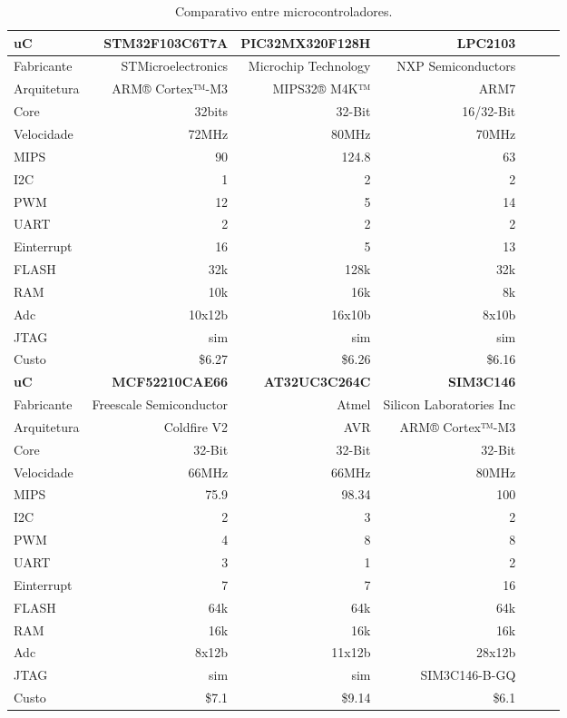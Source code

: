 \begin{table}[h]
\caption{Comparativo entre microcontroladores.}
\centering
\begin{tabular}{l|rrrrrr}
\toprule
\textbf{uC} & \textbf{STM32F103C6T7A} & \textbf{PIC32MX320F128H} & \textbf{LPC2103} \\ \hline
Fabricante & STMicroelectronics & Microchip Technology & NXP Semiconductors \\ \hline
Arquitetura & ARM® Cortex™-M3 & MIPS32® M4K™ & ARM7 \\ \hline
Core & 32bits & 32-Bit & 16/32-Bit \\ \hline
Velocidade & 72MHz & 80MHz & 70MHz \\ \hline
MIPS & 90 & 124.8 & 63 \\ \hline
I2C & 1 & 2 & 2 \\ \hline
PWM & 12 & 5 & 14 \\ \hline
UART & 2 & 2 & 2 \\ \hline
Einterrupt & 16 & 5 & 13 \\ \hline
FLASH & 32k & 128k & 32k \\ \hline
RAM & 10k & 16k & 8k \\ \hline
Adc & 10x12b & 16x10b & 8x10b \\ \hline
JTAG & sim & sim & sim \\ \hline
Custo & \$6.27 & \$6.26 & \$6.16 \\
\toprule
\textbf{uC} & \textbf{MCF52210CAE66} & \textbf{AT32UC3C264C} & \textbf{SIM3C146} \\ \hline
Fabricante & Freescale Semiconductor & Atmel & Silicon Laboratories Inc \\ \hline
Arquitetura & Coldfire V2 & AVR & ARM® Cortex™-M3 \\ \hline
Core & 32-Bit & 32-Bit & 32-Bit \\ \hline
Velocidade & 66MHz & 66MHz & 80MHz \\ \hline
MIPS & 75.9 & 98.34 & 100 \\ \hline
I2C & 2 & 3 & 2 \\ \hline
PWM & 4 & 8 & 8 \\ \hline
UART & 3 & 1 & 2 \\ \hline
Einterrupt & 7 & 7 & 16 \\ \hline
FLASH & 64k & 64k & 64k \\ \hline
RAM & 16k & 16k & 16k \\ \hline
Adc & 8x12b & 11x12b & 28x12b \\ \hline
JTAG & sim & sim & SIM3C146-B-GQ \\ \hline
Custo & \$7.1 & \$9.14 & \$6.1 \\ \bottomrule
\end{tabular}
\label{tab:alternativas_microcontrolador}
\end{table}

